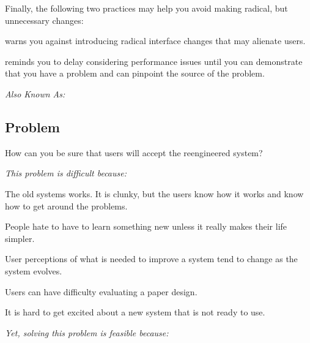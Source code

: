 \documentclass[a4paper,10pt,twoside]{book}
\begin{document}
Finally, the following two practices may help you avoid making radical, but unnecessary changes:

\begin{bulletlist}
\item {} warns you against introducing radical interface changes that may alienate users.

\item {} reminds you to delay considering performance issues until you can demonstrate that you have a problem and can pinpoint the source of the problem.
\end{bulletlist}



\emph{Also Known As:}   \cite{Copl95d}


\subsection*{Problem}

How can you be sure that users will accept the reengineered system?

\emph{This problem is difficult because:} 

\begin{bulletlist}
\item The old systems works. It is clunky, but the users know how it works and know how to get around the problems.

\item People hate to have to learn something new unless it really makes their life simpler.

\item User perceptions of what is needed to improve a system tend to change as the system evolves.

\item Users can have difficulty evaluating a paper design.

\item It is hard to get excited about a new system that is not ready to use.
\end{bulletlist}

\emph{Yet, solving this problem is feasible because:}
\end{document}
